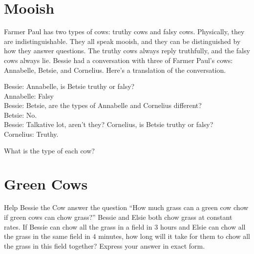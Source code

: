 \documentclass{article}
\begin{document}
\section*{Mooish}
Farmer Paul has two types of cows: truthy cows and falsy cows.
Physically, they are indistinguishable.
They all speak mooish, and they can be distinguished by how they answer questions.
The truthy cows always reply truthfully, and the falsy cows always lie.
Bessie had a conversation with three of Farmer Paul's cows: Annabelle, Betsie, and Cornelius.
Here's a translation of the conversation.
\begin{displayquote}
	Bessie: Annabelle, is Betsie truthy or falsy? \\
	Annabelle: Falsy \\
	Bessie: Betsie, are the types of Annabelle and Cornelius different? \\
	Betsie: No. \\
	Bessie: Talkative lot, aren't they? Cornelius, is Betsie truthy or falsy? \\
	Cornelius: Truthy.
\end{displayquote}
What is the type of each cow?

\section*{Green Cows}
Help Bessie the Cow answer the question ``How much grass can a green cow chow if green cows can chow grass?''
Bessie and Elsie both chow grass at constant rates.
If Bessie can chow all the grass in a field in $3$ hours and Elsie can chow all the grass in the same field in $4$ minutes, how long will it take for them to chow all the grass in this field together?
Express your answer in exact form.
\end{document}
